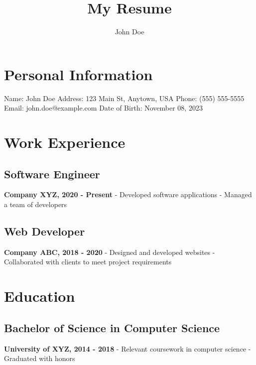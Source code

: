 \documentclass{article}%
\title{My Resume}%
\author{John Doe}%
\begin{document}
%
\normalsize%
\maketitle%
\section{Personal Information}%
\label{sec:PersonalInformation}%
Name: John Doe\newline%
%
Address: 123 Main St, Anytown, USA\newline%
%
Phone: (555) 555{-}5555\newline%
%
Email: john.doe@example.com\newline%
%
Date of Birth: November 08, 2023\newline%

%
\section{Work Experience}%
\label{sec:WorkExperience}%
\subsection{Software Engineer}%
\label{subsec:SoftwareEngineer}%
\textbf{Company XYZ, 2020 {-} Present}%
\newline%
%
 {-} Developed software applications\newline%
%
 {-} Managed a team of developers\newline%

%
\subsection{Web Developer}%
\label{subsec:WebDeveloper}%
\textbf{Company ABC, 2018 {-} 2020}%
\newline%
%
 {-} Designed and developed websites\newline%
%
 {-} Collaborated with clients to meet project requirements\newline%

%
\section{Education}%
\label{sec:Education}%
\subsection{Bachelor of Science in Computer Science}%
\label{subsec:BachelorofScienceinComputerScience}%
\textbf{University of XYZ, 2014 {-} 2018}%
\newline%
%
 {-} Relevant coursework in computer science\newline%
%
 {-} Graduated with honors\newline%

%
\end{document}

